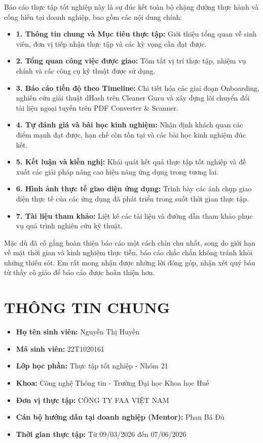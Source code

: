 \documentclass[12pt, a4paper]{article}
\begin{document}
Báo cáo thực tập tốt nghiệp này là sự đúc kết toàn bộ chặng đường thực hành và cống hiến tại doanh nghiệp, bao gồm các nội dung chính:
\begin{itemize}
    \item \textbf{1. Thông tin chung và Mục tiêu thực tập:} Giới thiệu tổng quan về sinh viên, đơn vị tiếp nhận thực tập và các kỳ vọng cần đạt được.
    \item \textbf{2. Tổng quan công việc được giao:} Tóm tắt vị trí thực tập, nhiệm vụ chính và các công cụ kỹ thuật được sử dụng.
    \item \textbf{3. Báo cáo tiến độ theo Timeline:} Chi tiết hóa các giai đoạn Onboarding, nghiên cứu giải thuật dHash trên Cleaner Guru và xây dựng lõi chuyển đổi tài liệu ngoại tuyến trên PDF Converter \& Scanner.
    \item \textbf{4. Tự đánh giá và bài học kinh nghiệm:} Nhận định khách quan các điểm mạnh đạt được, hạn chế còn tồn tại và các bài học kinh nghiệm đúc kết.
    \item \textbf{5. Kết luận và kiến nghị:} Khái quát kết quả thực tập tốt nghiệp và đề xuất các giải pháp nâng cao hiệu năng ứng dụng trong tương lai.
    \item \textbf{6. Hình ảnh thực tế giao diện ứng dụng:} Trình bày các ảnh chụp giao diện thực tế của các ứng dụng đã phát triển trong suốt thời gian thực tập.
    \item \textbf{7. Tài liệu tham khảo:} Liệt kê các tài liệu và đường dẫn tham khảo phục vụ quá trình nghiên cứu kỹ thuật.
\end{itemize}

Mặc dù đã cố gắng hoàn thiện báo cáo một cách chỉn chu nhất, song do giới hạn về mặt thời gian và kinh nghiệm thực tiễn, báo cáo chắc chắn không tránh khỏi những thiếu sót. Em rất mong nhận được những lời đóng góp, nhận xét quý báu từ thầy cô giáo để báo cáo được hoàn thiện hơn.

\newpage
\renewcommand{\contentsname}{MỤC LỤC}
\tableofcontents
\newpage


\section{THÔNG TIN CHUNG}
\begin{itemize}
    \item \textbf{Họ tên sinh viên:} Nguyễn Thị Huyền
    \item \textbf{Mã sinh viên:} 22T1020161
    \item \textbf{Lớp học phần:} Thực tập tốt nghiệp - Nhóm 21
    \item \textbf{Khoa:} Công nghệ Thông tin - Trường Đại học Khoa học Huế
    \item \textbf{Đơn vị thực tập:} CÔNG TY FAA VIỆT NAM
    \item \textbf{Cán bộ hướng dẫn tại doanh nghiệp (Mentor):} Phan Bá Đủ
    \item \textbf{Thời gian thực tập:} Từ 09/03/2026 đến 07/06/2026
\end{itemize}
\end{document}
